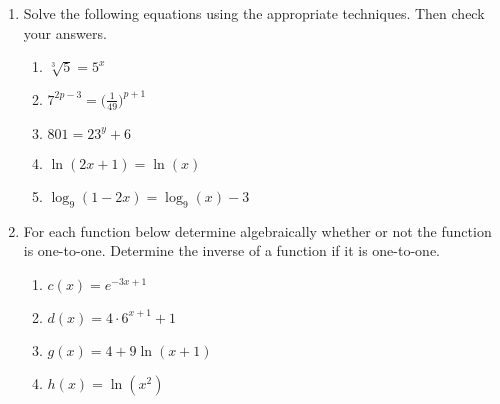 \begin{enumerate}
\item Solve the following equations using the appropriate techniques.
  Then check your answers.
  \begin{enumerate}
  \item $\sqrt[3]{5}=5^x$
  \item $\displaystyle 7^{2p-3}=\Big(\frac{1}{49}\Big)^{p+1}$
  \item $801=23^y+6$
  \item $\ln(2x+1) = \ln(x)$
  \item $\log_9(1-2x) = \log_9(x) - 3$
  \end{enumerate}
\item For each function below determine algebraically whether or not
  the function is one-to-one. Determine the inverse of a function if
  it is one-to-one.
  \begin{enumerate}
  \item ${\displaystyle c(x) = e^{-3x+1}}$
  \item ${\displaystyle d(x) = 4\cdot 6^{x+1} + 1}$
  \item ${\displaystyle g(x) = 4 + 9\ln\left(x+1\right)}$
  \item ${\displaystyle h(x) = \ln\left(x^2\right)}$
  \end{enumerate}
    


\end{enumerate}
